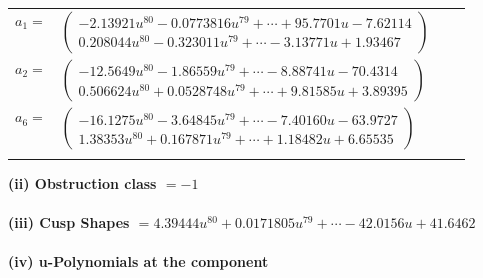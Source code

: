 \documentclass[1p]{elsarticle_modified}
\theoremstyle{definition}
\begin{document}
\begin{tabular}{m{7pt} m{180pt} m{7pt} m{180pt} }
\flushright $a_{1}=$&$\begin{pmatrix}-2.13921 u^{80}-0.0773816 u^{79}+\cdots+95.7701 u-7.62114\\0.208044 u^{80}-0.323011 u^{79}+\cdots-3.13771 u+1.93467\end{pmatrix}$ \\
\flushright $a_{2}=$&$\begin{pmatrix}-12.5649 u^{80}-1.86559 u^{79}+\cdots-8.88741 u-70.4314\\0.506624 u^{80}+0.0528748 u^{79}+\cdots+9.81585 u+3.89395\end{pmatrix}$ \\
\flushright $a_{6}=$&$\begin{pmatrix}-16.1275 u^{80}-3.64845 u^{79}+\cdots-7.40160 u-63.9727\\1.38353 u^{80}+0.167871 u^{79}+\cdots+1.18482 u+6.65535\end{pmatrix}$\\&\end{tabular}
\flushleft \textbf{(ii) Obstruction class $= -1$}\\~\\
\flushleft \textbf{(iii) Cusp Shapes $= 4.39444 u^{80}+0.0171805 u^{79}+\cdots-42.0156 u+41.6462$}\\~\\
\newpage\renewcommand{\arraystretch}{1}
\flushleft \textbf{(iv) u-Polynomials at the component}\newline \\
\end{document}
